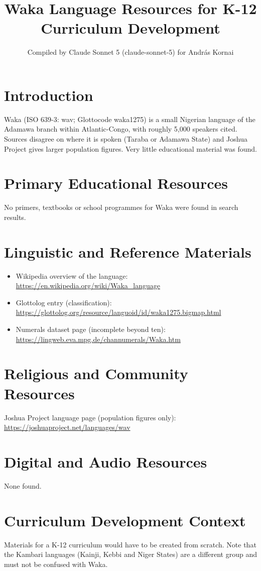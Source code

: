 \documentclass[12pt]{article}
\title{Waka Language Resources for K-12 Curriculum Development}
\author{Compiled by Claude Sonnet 5 (claude-sonnet-5) for Andr\'as Kornai}
\date{}
\begin{document}
\maketitle
\section{Introduction}
Waka (ISO 639-3: wav; Glottocode waka1275) is a small Nigerian language of the Adamawa branch within Atlantic-Congo, with roughly 5,000 speakers cited. Sources disagree on where it is spoken (Taraba or Adamawa State) and Joshua Project gives larger population figures. Very little educational material was found.
\section{Primary Educational Resources}
No primers, textbooks or school programmes for Waka were found in search results.
\section{Linguistic and Reference Materials}
\begin{itemize}
\item Wikipedia overview of the language: \url{https://en.wikipedia.org/wiki/Waka_language}
\item Glottolog entry (classification): \url{https://glottolog.org/resource/languoid/id/waka1275.bigmap.html}
\item Numerals dataset page (incomplete beyond ten): \url{https://lingweb.eva.mpg.de/channumerals/Waka.htm}
\end{itemize}
\section{Religious and Community Resources}
Joshua Project language page (population figures only): \url{https://joshuaproject.net/languages/wav}
\section{Digital and Audio Resources}
None found.
\section{Curriculum Development Context}
Materials for a K-12 curriculum would have to be created from scratch. Note that the Kambari languages (Kainji, Kebbi and Niger States) are a different group and must not be confused with Waka.
\end{document}
